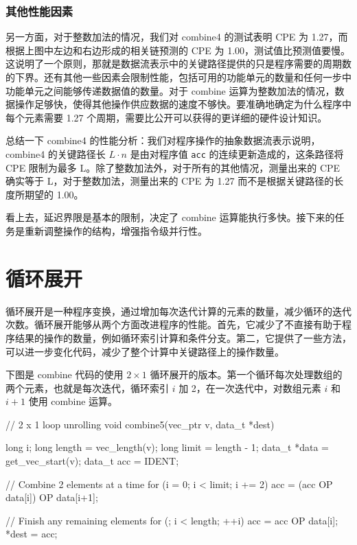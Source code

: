 \subsubsection{其他性能因素}

另一方面，对于整数加法的情况，我们对 combine4 的测试表明 CPE 为 1.27，而根据上图中左边和右边形成的相关链预测的 CPE 为 1.00，测试值比预测值要慢。这说明了一个原则，那就是数据流表示中的关键路径提供的只是程序需要的周期数的下界。还有其他一些因素会限制性能，包括可用的功能单元的数量和任何一步中功能单元之间能够传递数据值的数量。对于 combine 运算为整数加法的情况，数据操作足够快，使得其他操作供应数据的速度不够快。要准确地确定为什么程序中每个元素需要 1.27 个周期，需要比公开可以获得的更详细的硬件设计知识。

总结一下 combine4 的性能分析：我们对程序操作的抽象数据流表示说明，combine4 的关键路径长 $L \cdot n$ 是由对程序值 \verb|acc| 的连续更新造成的，这条路径将 CPE 限制为最多 L。除了整数加法外，对于所有的其他情况，测量出来的 CPE 确实等于 L，对于整数加法，测量出来的 CPE 为 1.27 而不是根据关键路径的长度所期望的 1.00。

看上去，延迟界限是基本的限制，决定了 combine 运算能执行多快。接下来的任务是重新调整操作的结构，增强指令级并行性。

\section{循环展开}

循环展开是一种程序变换，通过增加每次迭代计算的元素的数量，减少循环的迭代次数。循环展开能够从两个方面改进程序的性能。首先，它减少了不直接有助于程序结果的操作的数量，例如循环索引计算和条件分支。第二，它提供了一些方法，可以进一步变化代码，减少了整个计算中关键路径上的操作数量。

下图是 combine 代码的使用 $2 \times 1$ 循环展开的版本。第一个循环每次处理数组的两个元素，也就是每次迭代，循环索引 $i$ 加 2，在一次迭代中，对数组元素 $i$ 和 $i+1$ 使用 combine 运算。

\begin{cppcode}
// 2 x 1 loop unrolling
void combine5(vec_ptr v, data_t *dest) {
  long i;
  long length = vec_length(v);
  long limit = length - 1;
  data_t *data = get_vec_start(v);
  data_t acc = IDENT;

  // Combine 2 elements at a time
  for (i = 0; i < limit; i += 2) {
    acc = (acc OP data[i]) OP data[i+1];
  }

  // Finish any remaining elements
  for (; i < length; ++i) {
    acc = acc OP data[i];
  }
  *dest = acc;
}
\end{cppcode}

